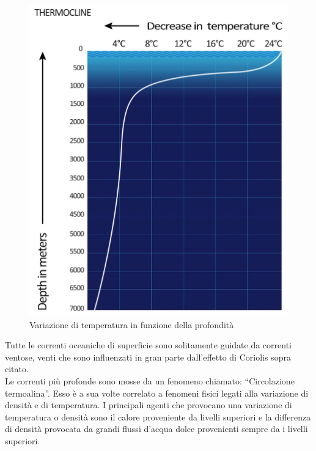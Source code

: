 \vfill
\newpage
\begin{figure}[H]
    \centering
    \includegraphics[height=0.4\textwidth]{res/cap 2/termoclino}
    \caption{Variazione di temperatura in funzione della profondità}
\end{figure}\noindent
Tutte le correnti oceaniche di superficie sono solitamente guidate da correnti ventose, venti che sono influenzati in gran parte dall'effetto di Coriolis sopra citato.\\
Le correnti più profonde sono mosse da un fenomeno chiamato: \enquote{Circolazione termoalina}.
Esso è a sua volte correlato a fenomeni fisici legati alla variazione di densità e di temperatura. I principali agenti che provocano una variazione di temperatura o densità sono il calore proveniente da livelli superiori e la differenza di densità provocata da grandi flussi d'acqua dolce provenienti sempre da i livelli superiori.\\

